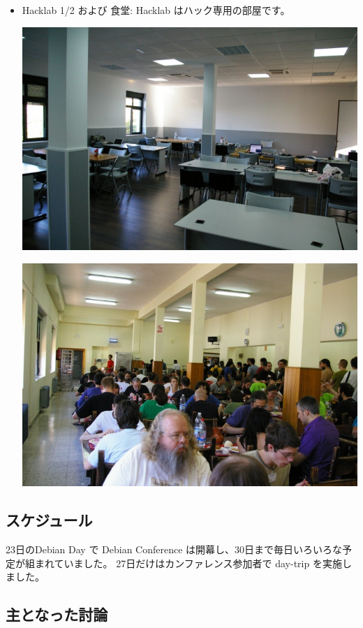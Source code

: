 \documentclass[mingoth,a4paper]{jsarticle}
\begin{document}
\begin{itemize}
  \item Hacklab 1/2 および 食堂: Hacklab はハック専用の部屋です。\\
	\begin{minipage}{0.4\hsize}
	\includegraphics[width=0.8\hsize]{image200908/debconf9_hacklab.jpg}
	\end{minipage}
	\begin{minipage}{0.4\hsize}
	\includegraphics[width=0.8\hsize]{image200908/debconf9_diningroom.jpg}
	\end{minipage}

\end{itemize} 

\subsection{スケジュール}

23日のDebian Day で Debian Conference は開幕し、30日まで毎日いろいろな予
定が組まれていました。
27日だけはカンファレンス参加者で day-trip を実施しました。

\subsection{主となった討論}
\end{document}
